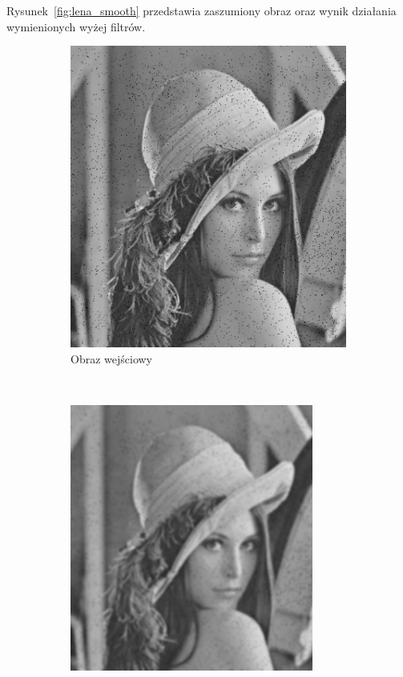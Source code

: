 Rysunek~\ref{fig:lena_smooth} przedstawia zaszumiony obraz oraz wynik działania wymienionych wyżej filtrów.
\begin{figure}
  \centering
  \begin{subfigure}[b]{0.45\textwidth}
    \includegraphics[width=\textwidth]{img/smooth-lena-input}
    \caption{Obraz wejściowy}
    \label{fig:smooth_lena_input}
  \end{subfigure}
  ~
  \begin{subfigure}[b]{0.45\textwidth}
    \includegraphics[width=\textwidth]{img/smooth-lena-gauss}

\end{subfigure}
\end{figure}

